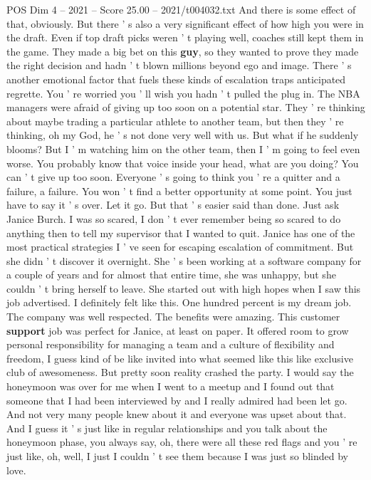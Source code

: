 \begin{textsample}{POS Dim 4 – 2021 – Score 25.00 – 2021/t004032.txt}
And there is some effect of that, obviously.
But there ' s also a very significant effect of how high you were in the draft.
Even if top draft picks weren ' t playing well, coaches still kept them in the game.
They made a big bet on this \textbf{guy}, so they wanted to prove they made the right decision and hadn ' t blown millions beyond ego and image.
There ' s another emotional factor that fuels these kinds of escalation traps anticipated regrette.
You ' re worried you ' ll wish you hadn ' t pulled the plug in.
The NBA managers were afraid of giving up too soon on a potential star.
They ' re thinking about maybe trading a particular athlete to another team, but then they ' re thinking, oh my God, he ' s not done very well with us.
But what if he suddenly blooms?
But I ' m watching him on the other team, then I ' m going to feel even worse.
You probably know that voice inside your head, what are you doing?
You can ' t give up too soon.
Everyone ' s going to think you ' re a quitter and a failure, a failure.
You won ' t find a better opportunity at some point.
You just have to say it ' s over.
Let it go.
But that ' s easier said than done.
Just ask Janice Burch.
I was so scared, I don ' t ever remember being so scared to do anything then to tell my supervisor that I wanted to quit.
Janice has one of the most practical strategies I ' ve seen for escaping escalation of commitment.
But she didn ' t discover it overnight.
She ' s been working at a software company for a couple of years and for almost that entire time, she was unhappy, but she couldn ' t bring herself to leave.
She started out with high hopes when I saw this job advertised.
I definitely felt like this.
One hundred percent is my dream job.
The company was well respected.
The benefits were amazing.
This customer \textbf{support} job was perfect for Janice, at least on paper.
It offered room to grow personal responsibility for managing a team and a culture of flexibility and freedom, I guess kind of be like invited into what seemed like this like exclusive club of awesomeness.
But pretty soon reality crashed the party.
I would say the honeymoon was over for me when I went to a meetup and I found out that someone that I had been interviewed by and I really admired had been let go.
And not very many people knew about it and everyone was upset about that.
And I guess it ' s just like in regular relationships and you talk about the honeymoon phase, you always say, oh, there were all these red flags and you ' re just like, oh, well, I just I couldn ' t see them because I was just so blinded by love.

\end{textsample}
